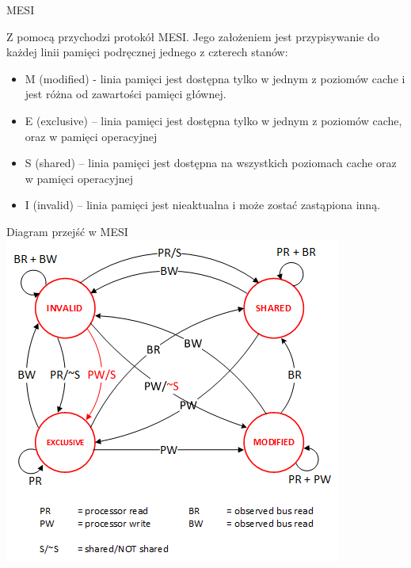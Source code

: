 \documentclass{beamer}
\begin{document}
\begin{frame}{MESI}

Z pomocą przychodzi protokół MESI. Jego założeniem jest przypisywanie do każdej linii pamięci podręcznej jednego z czterech stanów:
\pause
\begin{itemize}
    \item M (modified) - linia pamięci jest dostępna tylko w jednym z poziomów cache i jest różna od zawartości pamięci głównej.
    \pause
    \item E (exclusive) – linia pamięci jest dostępna tylko w jednym z poziomów cache, oraz w pamięci operacyjnej
    \pause
    \item S (shared) – linia pamięci jest dostępna na wszystkich poziomach cache oraz w pamięci operacyjnej
    \pause
    \item I (invalid) – linia pamięci jest nieaktualna i może zostać zastąpiona inną.
\end{itemize}
\end{frame}

\begin{frame}{Diagram przejść w MESI}
\centering
\includegraphics[scale=0.6]{assets/MESI.png}
\end{frame}
\end{document}
